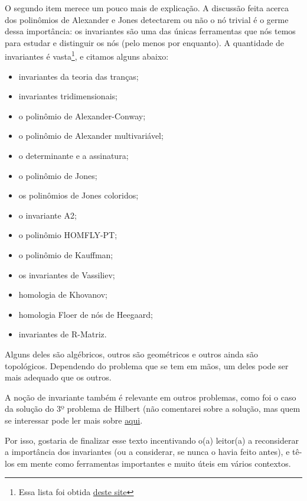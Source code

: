     \par\vspace{0.3cm} O segundo item merece um pouco mais de explicação. A discussão feita acerca
    dos polinômios de Alexander e Jones detectarem ou não o nó trivial é o germe dessa importância:
    os invariantes são uma das únicas ferramentas que nós temos para estudar e distinguir os nós
    (pelo menos por enquanto). A quantidade de invariantes é vasta\footnote{Essa lista foi obtida
    \href{http://katlas.org/wiki/Invariants}{deste site}}, e citamos alguns abaixo:
    \begin{itemize}
        \item invariantes da teoria das tranças;
        \item invariantes tridimensionais;
        \item o polinômio de Alexander-Conway;
        \item o polinômio de Alexander multivariável;
        \item o determinante e a assinatura;
        \item o polinômio de Jones;
        \item os polinômios de Jones coloridos;
        \item o invariante A2;
        \item o polinômio HOMFLY-PT;
        \item o polinômio de Kauffman;
        \item os invariantes de Vassiliev;
        \item homologia de Khovanov;
        \item homologia Floer de nós de Heegaard;
        \item invariantes de R-Matriz.
    \end{itemize}
    \par\vspace{0.3cm} Alguns deles são algébricos, outros são geométricos e outros ainda são topológicos.
    Dependendo do problema que se tem em mãos, um deles pode ser mais adequado que os outros.
    
    \par\vspace{0.3cm} A noção de invariante também é relevante em outros problemas, como foi o caso
    da solução do 3º problema de Hilbert (não comentarei sobre a solução, mas quem se interessar pode
    ler mais sobre \href{https://en.wikipedia.org/wiki/Hilbert\%27s_third_problem}{aqui}.
    
    \par\vspace{0.3cm} Por isso, gostaria de finalizar esse texto incentivando o(a) leitor(a) a 
    reconsiderar a importância dos invariantes (ou a considerar, se nunca o havia feito antes), e
    tê-los em mente como ferramentas importantes e muito úteis em vários contextos.